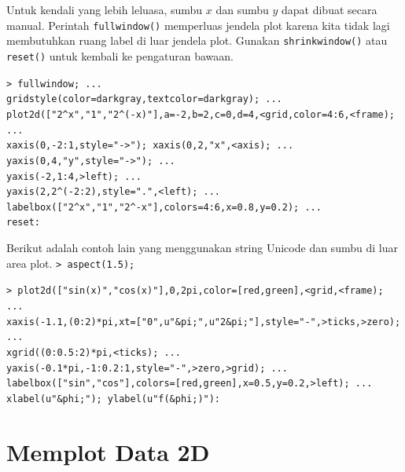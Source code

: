 \documentclass[11pt, a4paper]{article}
\newcommand{\emtcmd}[1]{\noindent\texttt{\textcolor{emtcommand}{>}\ #1}\par\smallskip}
\begin{document}
Untuk kendali yang lebih leluasa, sumbu $x$ dan sumbu $y$ dapat dibuat secara manual. Perintah \texttt{fullwindow()} memperluas jendela plot karena kita tidak lagi membutuhkan ruang label di luar jendela plot. Gunakan \texttt{shrinkwindow()} atau \texttt{reset()} untuk kembali ke pengaturan bawaan.

\emtcmd{fullwindow; ... \\
\hspace*{1em} gridstyle(color=darkgray,textcolor=darkgray); ... \\
\hspace*{1em} plot2d(["2\^{}x","1","2\^{}(-x)"],a=-2,b=2,c=0,d=4,<grid,color=4:6,<frame); ... \\
\hspace*{1em} xaxis(0,-2:1,style="->"); xaxis(0,2,"x",<axis); ... \\
\hspace*{1em} yaxis(0,4,"y",style="->"); ... \\
\hspace*{1em} yaxis(-2,1:4,>left); ... \\
\hspace*{1em} yaxis(2,2\^{}(-2:2),style=".",<left); ... \\
\hspace*{1em} labelbox(["2\^{}x","1","2\^{}-x"],colors=4:6,x=0.8,y=0.2); ... \\
\hspace*{1em} reset:}

Berikut adalah contoh lain yang menggunakan string Unicode dan sumbu di luar area plot.
\emtcmd{aspect(1.5);}
\emtcmd{plot2d(["sin(x)","cos(x)"],0,2pi,color=[red,green],<grid,<frame); ... \\
\hspace*{1em} xaxis(-1.1,(0:2)*pi,xt=["0",u"\&pi;",u"2\&pi;"],style="-",>ticks,>zero); ... \\
\hspace*{1em} xgrid((0:0.5:2)*pi,<ticks); ... \\
\hspace*{1em} yaxis(-0.1*pi,-1:0.2:1,style="-",>zero,>grid); ... \\
\hspace*{1em} labelbox(["sin","cos"],colors=[red,green],x=0.5,y=0.2,>left); ... \\
\hspace*{1em} xlabel(u"\&phi;"); ylabel(u"f(\&phi;)"):}

\section*{Memplot Data 2D}
\end{document}
